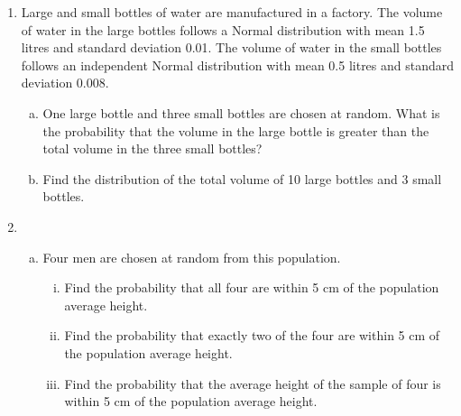 \documentclass[a4paper,12pt]{article}
\begin{document}

\begin{enumerate}



    \item 
Large and small bottles of water are manufactured in a factory. The volume of
water in the large bottles follows a Normal distribution with mean 1.5 litres and
standard deviation 0.01. The volume of water in the small bottles follows an
independent Normal distribution with mean 0.5 litres and standard deviation
0.008.
\begin{enumerate}[(a)]
\item  One large bottle and three small bottles are chosen at random. What is
the probability that the volume in the large bottle is greater than the
total volume in the three small bottles?
\item Find the distribution of the total volume of 10 large bottles and 3 small
bottles.
\end{enumerate}

\item
\begin{enumerate}[(a)]
In a certain large population, the heights X in cm of adult males have a Normal distribution with mean 170 and variance 100. 

\begin{enumerate}[(i)]
\item Find the probability that a randomly chosen man is within 5 cm of the population average height.  
\item Find the probability that a randomly chosen man is more than 185 cm tall.  
\item Given that a randomly chosen man is more than 185 cm tall, find the probability that he is more than 189.6 cm tall.  
\end{enumerate}

\item Four men are chosen at random from this population. 
\begin{enumerate}[(i)]
\item Find the probability that all four are within 5 cm of the population average height.  
\item Find the probability that exactly two of the four are within 5 cm of the population average height. 
\item Find the probability that the average height of the sample of four is within 5 cm of the population average height. 
\end{enumerate}


\end{enumerate}
\end{enumerate}
\end{document}
